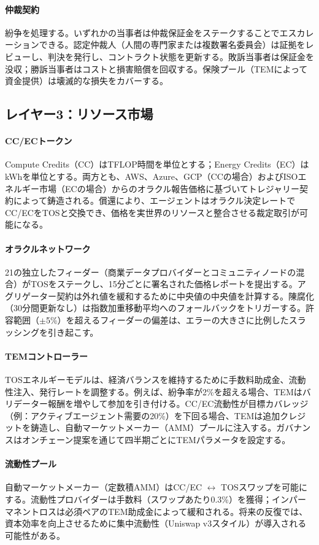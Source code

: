 \documentclass[11pt]{article}
\begin{document}
\paragraph{仲裁契約} 紛争を処理する。いずれかの当事者は仲裁保証金をステークすることでエスカレーションできる。認定仲裁人（人間の専門家または複数署名委員会）は証拠をレビューし、判決を発行し、コントラクト状態を更新する。敗訴当事者は保証金を没収；勝訴当事者はコストと損害賠償を回収する。保険プール（TEMによって資金提供）は壊滅的な損失をカバーする。

\subsection{レイヤー3：リソース市場}
\paragraph{CC/ECトークン} Compute Credits（CC）はTFLOP時間を単位とする；Energy Credits（EC）はkWhを単位とする。両方とも、AWS、Azure、GCP（CCの場合）およびISOエネルギー市場（ECの場合）からのオラクル報告価格に基づいてトレジャリー契約によって鋳造される。償還により、エージェントはオラクル決定レートでCC/ECをTOSと交換でき、価格を実世界のリソースと整合させる裁定取引が可能になる。

\paragraph{オラクルネットワーク} 21の独立したフィーダー（商業データプロバイダーとコミュニティノードの混合）がTOSをステークし、15分ごとに署名された価格レポートを提出する。アグリゲーター契約は外れ値を緩和するために中央値の中央値を計算する。陳腐化（30分間更新なし）は指数加重移動平均へのフォールバックをトリガーする。許容範囲（$\pm$5\%）を超えるフィーダーの偏差は、エラーの大きさに比例したスラッシングを引き起こす。

\paragraph{TEMコントローラー} TOSエネルギーモデルは、経済バランスを維持するために手数料助成金、流動性注入、発行レートを調整する。例えば、紛争率が2\%を超える場合、TEMはバリデーター報酬を増やして参加を引き付ける。CC/EC流動性が目標カバレッジ（例：アクティブエージェント需要の20\%）を下回る場合、TEMは追加クレジットを鋳造し、自動マーケットメーカー（AMM）プールに注入する。ガバナンスはオンチェーン提案を通じて四半期ごとにTEMパラメータを設定する。

\paragraph{流動性プール} 自動マーケットメーカー（定数積AMM）はCC/EC $\leftrightarrow$ TOSスワップを可能にする。流動性プロバイダーは手数料（スワップあたり0.3\%）を獲得；インパーマネントロスは必須ペアのTEM助成金によって緩和される。将来の反復では、資本効率を向上させるために集中流動性（Uniswap v3スタイル）が導入される可能性がある。
\end{document}

